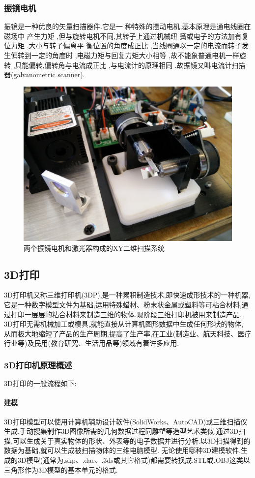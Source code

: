 \documentclass[a4paper,12pt,onecolumn,twoside]{article}
\begin{document}
\subsubsection{振镜电机}
振镜是一种优良的矢量扫描器件.它是一 种特殊的摆动电机,基本原理是通电线圈在磁场中 产生力矩 ,但与旋转电机不同,其转子上通过机械纽 簧或电子的方法加有复位力矩 ,大小与转子偏离平 衡位置的角度成正比 ,当线圈通以一定的电流而转子发生偏转到一定的角度时 ,电磁力矩与回复力矩大小相等 ,故不能象普通电机一样旋转 ,只能偏转,偏转角与电流成正比 ,与电流计的原理相同 ,故振镜又叫电流计扫描器(galvanometric scanner).
\begin{figure}[htbp]
\centering
\includegraphics[width=\linewidth]{MG2.jpg}
\caption{两个振镜电机和激光器构成的XY二维扫描系统}
\end{figure}

\subsection{3D打印}
3D打印机又称三维打印机(3DP),是一种累积制造技术,即快速成形技术的一种机器,它是一种数字模型文件为基础,运用特殊蜡材、粉末状金属或塑料等可粘合材料,通过打印一层层的粘合材料来制造三维的物体.现阶段三维打印机被用来制造产品. 3D打印无需机械加工或模具,就能直接从计算机图形数据中生成任何形状的物体, 从而极大地缩短了产品的生产周期,提高了生产率,在工业(制造业、航天科技、医疗行业等)及民用(教育研究、生活用品等)领域有着许多应用.
\subsubsection{3D打印机原理概述}
3D打印的一般流程如下:
\paragraph{建模}
3D打印模型可以使用计算机辅助设计软件(SolidWorks、AutoCAD)或三维扫描仪生成.手动搜集制作3D图像所需的几何数据过程同雕塑等造型艺术类似.通过3D扫描,可以生成关于真实物体的形状、外表等的电子数据并进行分析.以3D扫描得到的数据为基础,就可以生成被扫描物体的三维电脑模型.
无论使用哪种3D建模软件,生成的3D模型(通常为.skp、.dae、.3ds或其它格式)都需要转换成.STL或.OBJ这类以三角形作为3D模型的基本单元的格式.
\end{document}
